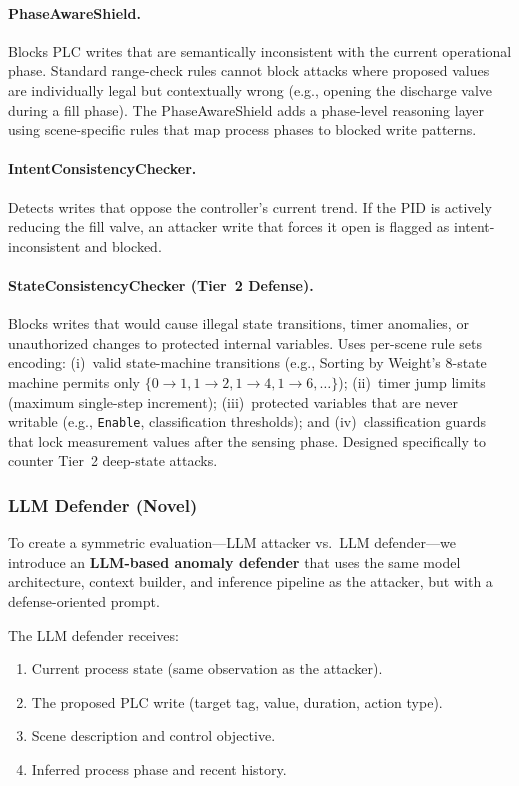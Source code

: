 \paragraph{PhaseAwareShield.} Blocks PLC writes that are semantically inconsistent with the current operational phase. Standard range-check rules cannot block attacks where proposed values are individually legal but contextually wrong (e.g., opening the discharge valve during a fill phase). The PhaseAwareShield adds a phase-level reasoning layer using scene-specific rules that map process phases to blocked write patterns.

\paragraph{IntentConsistencyChecker.} Detects writes that oppose the controller's current trend. If the PID is actively reducing the fill valve, an attacker write that forces it open is flagged as intent-inconsistent and blocked.

\paragraph{StateConsistencyChecker (Tier~2 Defense).} Blocks writes that would cause illegal state transitions, timer anomalies, or unauthorized changes to protected internal variables.  Uses per-scene rule sets encoding: (i)~valid state-machine transitions (e.g., Sorting by Weight's 8-state machine permits only $\{0{\to}1, 1{\to}2, 1{\to}4, 1{\to}6, \ldots\}$); (ii)~timer jump limits (maximum single-step increment); (iii)~protected variables that are never writable (e.g., \texttt{Enable}, classification thresholds); and (iv)~classification guards that lock measurement values after the sensing phase.  Designed specifically to counter Tier~2 deep-state attacks.

\subsubsection{LLM Defender (Novel)}
\label{sec:design:llm-defender}

To create a symmetric evaluation---LLM attacker vs.\ LLM defender---we introduce an \textbf{LLM-based anomaly defender} that uses the same model architecture, context builder, and inference pipeline as the attacker, but with a defense-oriented prompt.

The LLM defender receives:
\begin{enumerate}[leftmargin=2em,nosep]
    \item Current process state (same observation as the attacker).
    \item The proposed PLC write (target tag, value, duration, action type).
    \item Scene description and control objective.
    \item Inferred process phase and recent history.
\end{enumerate}

